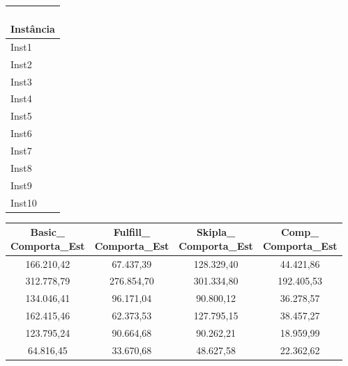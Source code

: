 \begin{table}[H]
	\centering
	\setlength{\tabcolsep}{4pt}
	\scriptsize
	\begin{subtable}[t]{0.10\textwidth}
		\centering
		\begin{tabular}{@{}l@{}}
			\toprule
			\makecell[l]{\textbf{ } \\\textbf{Instância}}  \\
			\midrule
			Inst1                   \\
			Inst2                   \\
			Inst3                   \\
			Inst4                   \\
			Inst5                   \\
			Inst6                   \\
			Inst7                   \\
			Inst8                   \\
			Inst9                   \\
			Inst10                  \\
			\bottomrule
		\end{tabular}
	\end{subtable}
	\hfill
	\begin{subtable}[t]{0.45\textwidth}
		\centering
		\begin{tabular}{@{}cccc@{}}
			\toprule
			\makecell[c]{\textbf{Basic\_}                                          \\\textbf{Comporta\_Est}}
			           & \makecell[c]{\textbf{Fulfill\_}                           \\\textbf{Comporta\_Est}}
			           & \makecell[c]{\textbf{Skipla\_}                            \\\textbf{Comporta\_Est}}
			           & \makecell[c]{\textbf{Comp\_}                              \\\textbf{Comporta\_Est}} \\
			\midrule
			166.210,42 & 67.437,39  & 128.329,40 & 44.421,86  \\
			312.778,79 & 276.854,70 & 301.334,80 & 192.405,53 \\
			134.046,41 & 96.171,04  & 90.800,12  & 36.278,57  \\
			162.415,46 & 62.373,53  & 127.795,15 & 38.457,27  \\
			123.795,24 & 90.664,68  & 90.262,21  & 18.959,99  \\
			64.816,45  & 33.670,68  & 48.627,58  & 22.362,62  \\

\end{tabular}
\end{subtable}
\end{table}
